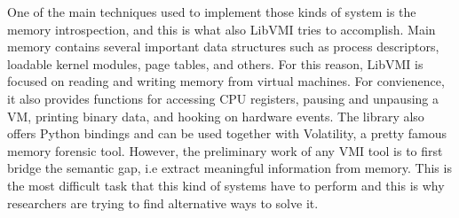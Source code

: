 One of the main techniques used to implement those kinds of system is the memory introspection, and this is what also LibVMI tries to accomplish. Main memory contains several important data structures such as process descriptors, loadable kernel modules, page tables, and others. For this reason, LibVMI is focused on reading and writing memory from virtual machines. For convienence, it also provides functions for accessing CPU registers, pausing and unpausing a VM, printing binary data, and hooking on hardware events. The library also offers Python bindings and can be used together with Volatility, a pretty famous memory forensic tool. However, the preliminary work of any VMI tool is to first bridge the semantic gap, i.e extract meaningful information from memory. This is the most difficult task that this kind of systems have to perform and this is why researchers are trying to find alternative ways to solve it. 
